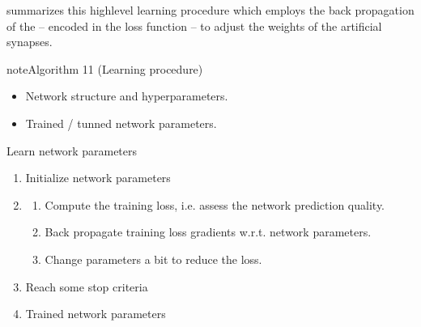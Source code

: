 \documentclass[letterpaper,10pt,english]{jupyterBook}
\begin{document}
\sphinxAtStartPar
{\hyperref[\detokenize{neuralnets_backprop:learning_alg}]{}} summarizes this high\sphinxhyphen{}level learning procedure which employs the back propagation of the  – encoded in the loss function – to adjust the weights of the artificial synapses.
\label{neuralnets_backprop:learning_alg}
\begin{sphinxadmonition}{note}{Algorithm 11 (Learning procedure)}



\sphinxAtStartPar
{}
\begin{itemize}
\item {} 
\sphinxAtStartPar
Network structure and hyper\sphinxhyphen{}parameters.

\end{itemize}

\sphinxAtStartPar
{}
\begin{itemize}
\item {} 
\sphinxAtStartPar
Trained / tunned network parameters.

\end{itemize}

\sphinxAtStartPar
{} Learn network parameters
\begin{enumerate}
%
\item {} 
\sphinxAtStartPar
Initialize network parameters

\item {} 
\sphinxAtStartPar
{}
\begin{enumerate}
%
\item {} 
\sphinxAtStartPar
Compute the training loss, i.e. assess the network prediction quality.

\item {} 
\sphinxAtStartPar
Back propagate training loss gradients w.r.t. network parameters.

\item {} 
\sphinxAtStartPar
Change parameters a bit to reduce the loss. 

\end{enumerate}

\item {} 
\sphinxAtStartPar
{} Reach some stop criteria

\item {} 
\sphinxAtStartPar
{} Trained network parameters

\end{enumerate}
\end{sphinxadmonition}
\end{document}
